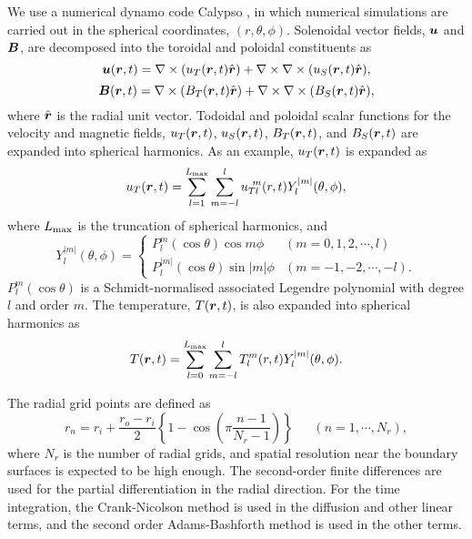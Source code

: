 We use a numerical dynamo code Calypso \cite{Matsui:2014}, in which numerical simulations are carried out in the spherical coordinates, $(r, \theta, \phi)$.
Solenoidal vector fields, $\mbox{\boldmath$u$}$ and $\mbox{\boldmath$B$}$, are decomposed into the toroidal and poloidal constituents as
%
\begin{equation}
\mbox{\boldmath$u$}(\mbox{\boldmath$r$}, t) = \nabla \times (u_T (\mbox{\boldmath$r$}, t) \hat{\mbox{\boldmath$r$}} ) + \nabla \times \nabla \times (u_S (\mbox{\boldmath$r$}, t) \hat{\mbox{\boldmath$r$}} ) ,
\label{eq:u_uT_uS}
\end{equation}
%
\begin{equation}
\mbox{\boldmath$B$}(\mbox{\boldmath$r$}, t) = \nabla \times (B_T (\mbox{\boldmath$r$}, t) \hat{\mbox{\boldmath$r$}} ) + \nabla \times \nabla \times (B_S (\mbox{\boldmath$r$}, t) \hat{\mbox{\boldmath$r$}} ) ,
\label{eq:B_BT_BS}
\end{equation}
%
where $\hat{\mbox{\boldmath$r$}}$ is the radial unit vector.
Todoidal and poloidal scalar functions for the velocity and magnetic fields, $u_T(\mbox{\boldmath$r$}, t)$, $u_S(\mbox{\boldmath$r$}, t)$, $B_T(\mbox{\boldmath$r$}, t)$, and $B_S(\mbox{\boldmath$r$}, t)$ are expanded into spherical harmonics.
As an example, $u_T (\mbox{\boldmath$r$}, t)$ is expanded as
%
\begin{equation}
u_T (\mbox{\boldmath$r$}, t) = \sum_{l = 1}^{L_{\rm max}} \sum_{m=-l}^{l} u_{T l}^{\ m} (r, t) Y_l^{|m|} (\theta, \phi) ,
\label{eq:uT_Ylm}
\end{equation}
%
where $L_{\rm max}$ is the truncation of spherical harmonics, and
%
\begin{equation}
Y_l^{|m|} (\theta, \phi) = \left\{
 \begin{array}{ll}
 P_l^m(\cos\theta)\cos m\phi & (m = 0, 1, 2, \cdots, l)
 \\
 P_l^{|m|}(\cos\theta)\sin |m|\phi & (m = -1, -2, \cdots, -l) .
 \end{array}
\right.
\label{eq:def_of_Ylm}
\end{equation}
%
$P_l^m(\cos\theta)$ is a Schmidt-normalised associated Legendre polynomial with degree $l$ and order $m$.
The temperature, $T(\mbox{\boldmath$r$}, t)$, is also expanded into spherical harmonics as
%
\begin{equation}
T (\mbox{\boldmath$r$}, t) = \sum_{l = 0}^{L_{\rm max}} \sum_{m=-l}^{l} T_l^m(r, t) Y_l^{|m|} (\theta, \phi) .
\label{eq:T_Ylm}
\end{equation}
%

The radial grid points are defined as
%
\begin{equation}
r_n = r_i + \frac{r_o - r_i}{2} \left\{ 1 - \cos \left( \pi \frac{n-1}{N_r-1} \right) \right\} ~~\;\;\;\; (n = 1, \cdots , N_r) ,
\label{eq:def_of_rn}
\end{equation}
%
where $N_r$ is the number of radial grids, and spatial resolution near the boundary surfaces is expected to be high enough.
The second-order finite differences are used for the partial differentiation in the radial direction.
For the time integration, the Crank-Nicolson method is used in the diffusion and other linear terms, and the second order Adams-Bashforth method is used in the other terms.

